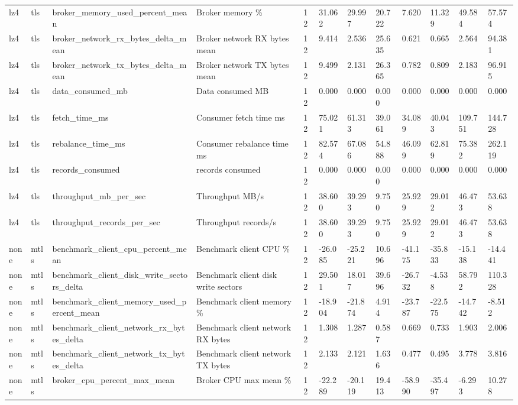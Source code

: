 \begin{longtable}{llllllllllll}
lz4 & tls & broker\_memory\_used\_percent\_mean & Broker memory \% & 12 & 31.062 & 29.997 & 20.722 & 7.620 & 11.329 & 49.584 & 57.574 \\
lz4 & tls & broker\_network\_rx\_bytes\_delta\_mean & Broker network RX bytes mean & 12 & 9.414 & 2.536 & 25.635 & 0.621 & 0.665 & 2.564 & 94.381 \\
lz4 & tls & broker\_network\_tx\_bytes\_delta\_mean & Broker network TX bytes mean & 12 & 9.499 & 2.131 & 26.365 & 0.782 & 0.809 & 2.183 & 96.915 \\
lz4 & tls & data\_consumed\_mb & Data consumed MB & 12 & 0.000 & 0.000 & 0.000 & 0.000 & 0.000 & 0.000 & 0.000 \\
lz4 & tls & fetch\_time\_ms & Consumer fetch time ms & 12 & 75.021 & 61.313 & 39.061 & 34.089 & 40.043 & 109.751 & 144.728 \\
lz4 & tls & rebalance\_time\_ms & Consumer rebalance time ms & 12 & 82.574 & 67.086 & 54.888 & 46.099 & 62.819 & 75.382 & 262.119 \\
lz4 & tls & records\_consumed & records consumed & 12 & 0.000 & 0.000 & 0.000 & 0.000 & 0.000 & 0.000 & 0.000 \\
lz4 & tls & throughput\_mb\_per\_sec & Throughput MB/s & 12 & 38.600 & 39.293 & 9.750 & 25.929 & 29.012 & 46.473 & 53.638 \\
lz4 & tls & throughput\_records\_per\_sec & Throughput records/s & 12 & 38.600 & 39.293 & 9.750 & 25.929 & 29.012 & 46.473 & 53.638 \\
none & mtls & benchmark\_client\_cpu\_percent\_mean & Benchmark client CPU \% & 12 & -26.085 & -25.221 & 10.696 & -41.175 & -35.833 & -15.138 & -14.441 \\
none & mtls & benchmark\_client\_disk\_write\_sectors\_delta & Benchmark client disk write sectors & 12 & 29.501 & 18.017 & 39.696 & -26.732 & -4.538 & 58.792 & 110.328 \\
none & mtls & benchmark\_client\_memory\_used\_percent\_mean & Benchmark client memory \% & 12 & -18.904 & -21.874 & 4.914 & -23.787 & -22.575 & -14.742 & -8.512 \\
none & mtls & benchmark\_client\_network\_rx\_bytes\_delta & Benchmark client network RX bytes & 12 & 1.308 & 1.287 & 0.587 & 0.669 & 0.733 & 1.903 & 2.006 \\
none & mtls & benchmark\_client\_network\_tx\_bytes\_delta & Benchmark client network TX bytes & 12 & 2.133 & 2.121 & 1.636 & 0.477 & 0.495 & 3.778 & 3.816 \\
none & mtls & broker\_cpu\_percent\_max\_mean & Broker CPU max mean \% & 12 & -22.289 & -20.119 & 19.413 & -58.990 & -35.497 & -6.293 & 10.278 \\

\end{longtable}
